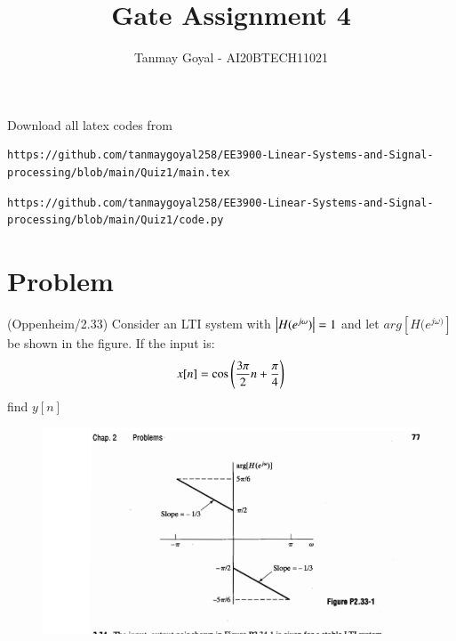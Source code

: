 \documentclass[journal,12pt,twocolumn]{IEEEtran}
\begin{document}
\def\putbox#1#2#3{\makebox[0in][l]{\makebox[#1][l]{}\raisebox{\baselineskip}[0in][0in]{\raisebox{#2}[0in][0in]{#3}}}}
     \def\rightbox#1{\makebox[0in][r]{#1}}
     \def\centbox#1{\makebox[0in]{#1}}
     \def\topbox#1{\raisebox{-\baselineskip}[0in][0in]{#1}}
     \def\midbox#1{\raisebox{-0.5\baselineskip}[0in][0in]{#1}}
\vspace{3cm}
\title{Gate Assignment 4}
\author{Tanmay Goyal - AI20BTECH11021}
\maketitle
\newpage
\bigskip
\renewcommand{\thefigure}{\theenumi}
\renewcommand{\thetable}{\theenumi}

Download all latex codes from 
\begin{lstlisting}
https://github.com/tanmaygoyal258/EE3900-Linear-Systems-and-Signal-processing/blob/main/Quiz1/main.tex
\end{lstlisting}
\begin{lstlisting}
https://github.com/tanmaygoyal258/EE3900-Linear-Systems-and-Signal-processing/blob/main/Quiz1/code.py
\end{lstlisting}
\section{Problem}
(Oppenheim/2.33) Consider an LTI system with $\left\vert H(e^{j\omega})\right\vert = 1$ and let $arg[H(e^{j\omega)}]$ be shown in the figure.  If the input is:
\begin{align}
    x[n] = \cos \left(\frac{3\pi}{2}n + \frac{\pi}{4}\right)
\end{align}
find $y[n]$

\begin{figure}[!ht]
\centering
 \includegraphics[width=\columnwidth]{Figure.png}
\end{figure}
\end{document}
